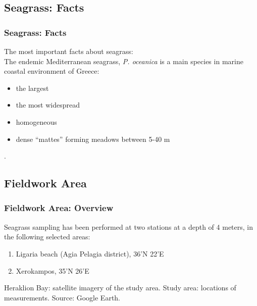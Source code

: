 \documentclass[pdflatex,compress]{beamer}
\begin{document}
\subsection{Seagrass: Facts}
\begin{frame}\frametitle{Seagrass: Facts}
The most important facts about seagrass:\\
The endemic Mediterranean seagrass, \emph{P. oceanica} is a main species in marine coastal environment of Greece:
\begin{itemize}
	\item the largest
	\item the most widespread
	\item homogeneous
	\item dense “mattes” forming meadows between 5-40 m
\end{itemize}
\begin{figure}[H]
	\centering
			\hspace{1mm}
			\hspace{1mm}
\end{figure}.
\end{frame}

\subsection{Fieldwork Area}
\begin{frame}\frametitle{Fieldwork Area: Overview}
\vspace{2em}
\footnotesize{Seagrass sampling has been performed at two stations at a depth of 4 meters, in the following selected areas:
\begin{enumerate}
	\item Ligaria beach (Agia Pelagia district), 36'N 22'E
	\item Xerokampos, 35'N 26'E
\end{enumerate}}
\begin{figure}[H]
	\centering
			\hspace{1mm}
\end{figure}
\scriptsize{Heraklion Bay: satellite imagery of the study area. Study area: locations of measurements. Source: Google Earth.}
\end{frame}
\end{document}
